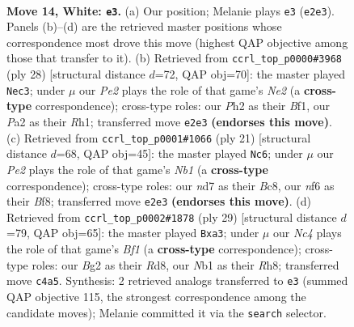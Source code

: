 \documentclass[11pt]{article}
\begin{document}
\clearpage

\begin{figure}[p]\centering
\begin{subfigure}{0.46\textwidth}\centering
\resizebox{\linewidth}{!}{%
\newchessgame
\chessboard[
  setfen={r1b2rk1/1p1n1p2/4pnp1/p1b4p/2N2B2/6P1/PP2PPBP/RN1R2K1 w - - 0 14},
  showmover=false,
  pgfstyle=straightmove, color=movearrow, markmove={e2-e3}
]}
\caption{}
\end{subfigure}\hfill
\begin{subfigure}{0.46\textwidth}\centering
\resizebox{\linewidth}{!}{%
\newchessgame
\chessboard[
  setfen={r1b1k2r/pp3ppp/2n1pn2/1NP1b3/8/P3BP2/1P2N1PP/R3KB1R w KQkq - 3 15},
  showmover=false,
  pgfstyle=straightmove, color=movearrow, markmove={e2-c3}
]}
\caption{}
\end{subfigure}
\\[4pt]
\begin{subfigure}{0.46\textwidth}\centering
\resizebox{\linewidth}{!}{%
\newchessgame
\chessboard[
  setfen={rnb1kb1r/1p3ppp/5n2/p3p3/8/1NN3P1/PP2PPBP/R1B1K2R b KQkq - 1 11},
  showmover=false,
  pgfstyle=straightmove, color=movearrow, markmove={b8-c6}
]}
\caption{}
\end{subfigure}\hfill
\begin{subfigure}{0.46\textwidth}\centering
\resizebox{\linewidth}{!}{%
\newchessgame
\chessboard[
  setfen={2kr1b1r/pbp3pp/1p2pp2/n7/3PP3/P1P2NP1/3B1PBP/3RR1K1 b - - 0 15},
  showmover=false,
  pgfstyle=straightmove, color=movearrow, markmove={f8-a3}
]}
\caption{}
\end{subfigure}
\caption{\textbf{Move 14, White: \texttt{e3}.} (a) Our position; Melanie plays \texttt{e3} (\texttt{e2e3}). Panels (b)--(d) are the retrieved master positions whose correspondence most drove this move (highest QAP objective among those that transfer to it). (b) Retrieved from \texttt{ccrl\_top\_p0000\#3968} (ply 28) [structural distance $d$=72, QAP obj=70]: the master played \texttt{Nec3}; under $\mu$ our \emph{Pe2} plays the role of that game's \emph{Ne2} (a \textbf{cross-type} correspondence); cross-type roles: our \emph{P}h2 as their \emph{B}f1, our \emph{P}a2 as their \emph{R}h1; transferred move \texttt{e2e3} \textbf{(endorses this move)}. (c) Retrieved from \texttt{ccrl\_top\_p0001\#1066} (ply 21) [structural distance $d$=68, QAP obj=45]: the master played \texttt{Nc6}; under $\mu$ our \emph{Pe2} plays the role of that game's \emph{Nb1} (a \textbf{cross-type} correspondence); cross-type roles: our \emph{n}d7 as their \emph{B}c8, our \emph{n}f6 as their \emph{B}f8; transferred move \texttt{e2e3} \textbf{(endorses this move)}. (d) Retrieved from \texttt{ccrl\_top\_p0002\#1878} (ply 29) [structural distance $d$=79, QAP obj=65]: the master played \texttt{Bxa3}; under $\mu$ our \emph{Nc4} plays the role of that game's \emph{Bf1} (a \textbf{cross-type} correspondence); cross-type roles: our \emph{B}g2 as their \emph{R}d8, our \emph{N}b1 as their \emph{R}h8; transferred move \texttt{c4a5}. Synthesis: 2 retrieved analogs transferred to \texttt{e3} (summed QAP objective 115, the strongest correspondence among the candidate moves); Melanie committed it via the \texttt{search} selector.}
\label{fig:thought-m26}
\end{figure}
\end{document}
